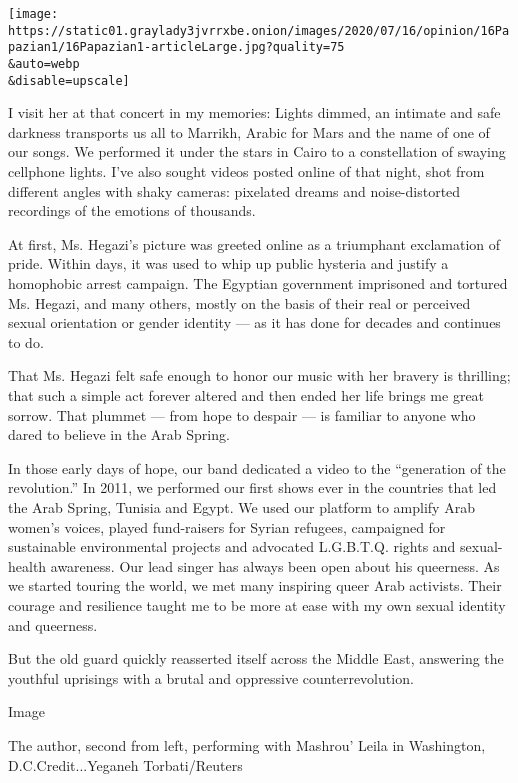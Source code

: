 \texttt{[image: https://static01.graylady3jvrrxbe.onion/images/2020/07/16/opinion/16Papazian1/16Papazian1-articleLarge.jpg?quality=75\\\&auto=webp\\\&disable=upscale]}

I visit her at that concert in my memories: Lights dimmed, an intimate
and safe darkness transports us all to Marrikh, Arabic for Mars and the
name of one of our songs. We performed it under the stars in Cairo to a
constellation of swaying cellphone lights. I've also sought videos
posted online of that night, shot from different angles with shaky
cameras: pixelated dreams and noise-distorted recordings of the emotions
of thousands.

At first, Ms. Hegazi's picture was greeted online as a triumphant
exclamation of pride. Within days, it was used to whip up public
hysteria and justify a homophobic arrest campaign. The Egyptian
government imprisoned and tortured Ms. Hegazi, and many others, mostly
on the basis of their real or perceived sexual orientation or gender
identity --- as it has done for decades and continues to do.

That Ms. Hegazi felt safe enough to honor our music with her bravery is
thrilling; that such a simple act forever altered and then ended her
life brings me great sorrow. That plummet --- from hope to despair ---
is familiar to anyone who dared to believe in the Arab Spring.

In those early days of hope, our band dedicated a video to the
``generation of the revolution.'' In 2011, we performed our first shows
ever in the countries that led the Arab Spring, Tunisia and Egypt. We
used our platform to amplify Arab women's voices, played fund-raisers
for Syrian refugees, campaigned for sustainable environmental projects
and advocated L.G.B.T.Q. rights and sexual-health awareness. Our lead
singer has always been open about his queerness. As we started touring
the world, we met many inspiring queer Arab activists. Their courage and
resilience taught me to be more at ease with my own sexual identity and
queerness.

But the old guard quickly reasserted itself across the Middle East,
answering the youthful uprisings with a brutal and oppressive
counterrevolution.

Image

The author, second from left, performing with Mashrou' Leila in
Washington, D.C.Credit...Yeganeh Torbati/Reuters


